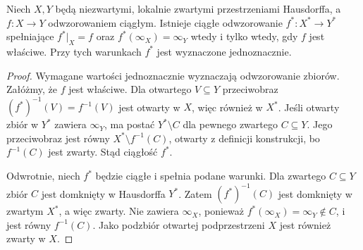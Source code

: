\begin{twierdzenie}
\label{thm:topog-uzwarcenia-aleksandrow-proper}
Niech $X,Y$ będą niezwartymi,
lokalnie zwartymi przestrzeniami Hausdorffa,
a $f\colon X\to Y$ odwzorowaniem ciągłym.
Istnieje ciągłe odwzorowanie
$f^\ast\colon X^\ast\to Y^\ast$
spełniające
$f^\ast|_X=f$ oraz
$f^\ast(\infty_X)=\infty_Y$
wtedy i tylko wtedy, gdy $f$
jest właściwe.
Przy tych warunkach $f^\ast$
jest wyznaczone jednoznacznie.
\end{twierdzenie}
\begin{proof}
Wymagane wartości jednoznacznie
wyznaczają odwzorowanie zbiorów.
Załóżmy, że $f$ jest właściwe.
Dla otwartego $V\subseteq Y$
przeciwobraz $(f^\ast)^{-1}(V)
=f^{-1}(V)$ jest otwarty w $X$,
więc również w $X^\ast$.
Jeśli otwarty zbiór w $Y^\ast$
zawiera $\infty_Y$, ma postać
$Y^\ast\setminus C$ dla pewnego
zwartego $C\subseteq Y$.
Jego przeciwobraz jest równy
$X^\ast\setminus f^{-1}(C)$,
otwarty z definicji konstrukcji,
bo $f^{-1}(C)$ jest zwarty.
Stąd ciągłość $f^\ast$.

Odwrotnie, niech $f^\ast$
będzie ciągłe i spełnia
podane warunki. Dla zwartego
$C\subseteq Y$ zbiór $C$ jest
domknięty w Hausdorffa $Y^\ast$.
Zatem $(f^\ast)^{-1}(C)$
jest domknięty w zwartym $X^\ast$,
a więc zwarty. Nie zawiera
$\infty_X$, ponieważ
$f^\ast(\infty_X)=\infty_Y\notin C$,
i jest równy $f^{-1}(C)$.
Jako podzbiór otwartej podprzestrzeni
$X$ jest również zwarty w $X$.
\end{proof}

